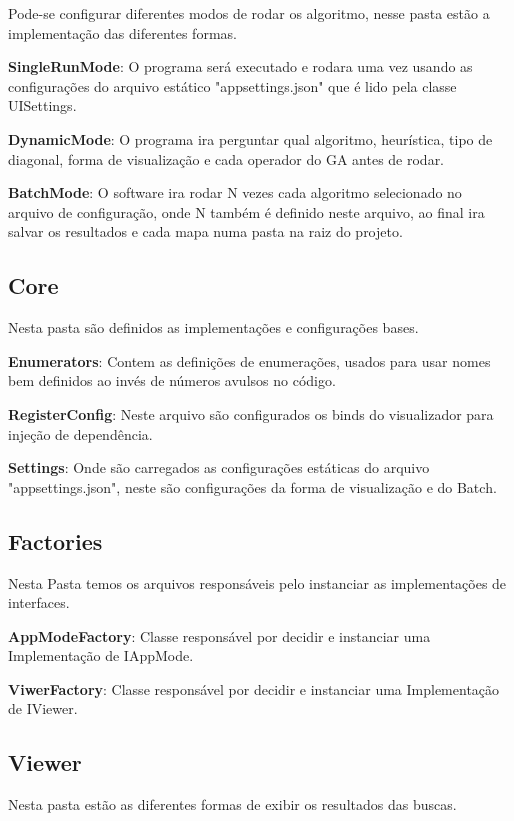  Pode-se configurar diferentes modos de rodar os algoritmo, nesse pasta estão a implementação das diferentes formas.
 
 \textbf{SingleRunMode}: O programa será executado e rodara uma vez usando as configurações do arquivo estático "appsettings.json" que é lido pela classe UISettings.
 
 \textbf{DynamicMode}: O programa ira perguntar qual algoritmo, heurística, tipo de diagonal, forma de visualização e cada operador do GA antes de rodar.
 
 \textbf{BatchMode}: O software ira rodar N vezes cada algoritmo selecionado no arquivo de configuração, onde N também é definido neste arquivo, ao final ira salvar os resultados e cada mapa numa pasta na raiz do projeto.
 
 
 \subsection{Core}
 
 Nesta pasta são definidos as implementações e configurações bases.
 
 \textbf{Enumerators}: Contem as definições de enumerações, usados para usar nomes bem definidos ao invés de números avulsos no código.
 
 \textbf{RegisterConfig}: Neste arquivo são configurados os binds do visualizador para injeção de dependência.
 
 \textbf{Settings}: Onde são carregados as configurações estáticas do arquivo "appsettings.json", neste são configurações da forma de visualização e do Batch.
 
 \subsection{Factories}
 
 Nesta Pasta temos os arquivos responsáveis pelo instanciar as implementações de interfaces.
 
 \textbf{AppModeFactory}: Classe responsável por decidir e instanciar uma Implementação de IAppMode.
 
 \textbf{ViwerFactory}: Classe responsável por decidir e instanciar uma Implementação de IViewer.
 
 \subsection{Viewer}
 
 Nesta pasta estão as diferentes formas de exibir os resultados das buscas.
 
